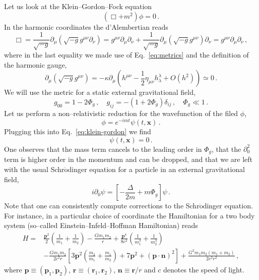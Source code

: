\documentclass[12pt]{article}
\newcommand{\be}{\begin{equation}}
\newcommand{\ee}{\end{equation}}
\newcommand\m{\mu}
\newcommand\n{\nu}
\renewcommand\l{\lambda}
\def\d{\partial}
\begin{document}
Let us look at the Klein--Gordon--Fock equation
\be
\label{eq:klein-gordon}
(\Box+m^2) \phi=0\,.
\ee
In the harmonic coordinates the d'Alembertian reads
\be
\Box=\frac{1}{\sqrt{-g}} \d_\m (\sqrt{-g}g^{\m\n}\d_\n)=g^{\m\n}\d_\m\d_\n+
\frac{1}{\sqrt{-g}} \d_\m(\sqrt{-g}g^{\m\n})\d_\n=g^{\m\n}\d_\m\d_\n\,,
\ee
where in the last equality we made use of Eq.~\eqref{eq:metrics} and the definition of the harmonic gauge,
\be
\d_\m(\sqrt{-g}g^{\m\n})=-\kappa \d_\m\left(h^{\m\n}-\frac{1}{2}\eta_{\m\n}h^\l_\l+O(h^2)\right)\simeq 0\,.
\ee
We will use the metric for a static external gravitational field,
\be
g_{00}=1-2\Phi_g\,,\quad  g_{ij}=-(1+2\Phi_g)\delta_{ij}\,,\quad \Phi_g \ll 1\,.
\ee
Let us perform a non--relativistic reduction for the wavefunction of the filed $\phi$,
\be
\phi=e^{-imt}\psi(t,\textbf{x})\,.
\ee
Plugging this into Eq.~\eqref{eq:klein-gordon} we find
\be
[(1+2\Phi_g)(-m^2-2im\d_0+\d_0^2)-\delta^{ij}\d_i\d_j+m^2] \psi(t,\textbf{x})=0\,.
\ee
One observes that the mass term cancels to the leading order in $\Phi_g$, that the $\partial_0^2$ term is higher order
in the momentum and can be dropped,
and that we are left with the usual Schr$\ddot{\text{o}}$dinger equation for
a particle in an external gravitational field,
\be
i\d_0\psi=\left[-\frac{\Delta}{2m}+m \Phi_g \right]\psi\,.
\ee
Note that one can consistently compute corrections
to the Schr$\ddot{\text{o}}$dinger equation.
For instance, in a particular choice of coordinate the Hamiltonian for a two body system (so--called Einstein--Infeld--Hoffman Hamiltonian)
reads \cite{Einstein:1938yz}
\be
\begin{split}
H=&\frac{\textbf{p}^2}{2}\left(\frac{1}{m_1}+\frac{1}{m_2}\right)-\frac{Gm_1m_2}{r}
+\frac{\textbf{p}^4}{8c^2}\left(\frac{1}{m_1^3}+\frac{1}{m_2^3}\right)\\
&-\frac{Gm_1m_2}{2c^2 r}\left[3\textbf{p}^2\left(\frac{m_2}{m_1}+\frac{m_1}{m_2}\right)+7\textbf{p}^2
+(\textbf{p}\cdot \textbf{n})^2
\right]+\frac{G^2m_1m_2(m_1+m_2)}{2c^2r^2}\,,
\end{split}
\ee
where $\textbf{p}\equiv (\textbf{p}_1,\textbf{p}_2)$,
$\textbf{r}\equiv (\textbf{r}_1,\textbf{r}_2)$,
$\textbf{n}\equiv \textbf{r}/r$ and $c$ denotes the speed of light.
\end{document}

